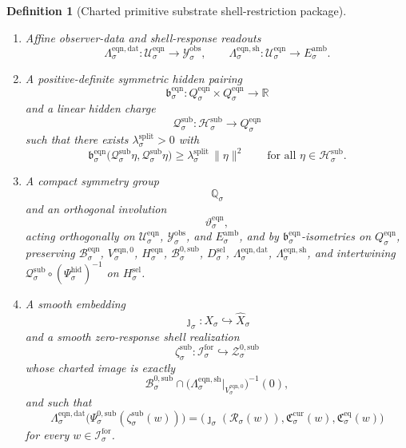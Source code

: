 \documentclass[11pt]{article}
\newcommand{\ForSpace}[1]{\mathcal I_{#1}^{\mathrm{for}}}
\newcommand{\Reduction}[1]{\mathcal R_{#1}}
\newcommand{\CurrentCarrier}[1]{\mathfrak C_{#1}^{\mathrm{cur}}}
\newcommand{\EqCarrier}[1]{\mathfrak C_{#1}^{\mathrm{eq}}}
\newcommand{\VisibleAffine}[1]{\widehat X_{#1}}
\newcommand{\DataSpace}[1]{\mathcal Y_{#1}^{\mathrm{obs}}}
\newcommand{\AmbientTarget}[1]{E_{#1}^{\mathrm{amb}}}
\newcommand{\EqnSpace}[1]{\mathcal U_{#1}^{\mathrm{eqn}}}
\newcommand{\EqnBody}[1]{\mathcal B_{#1}^{\mathrm{eqn}}}
\newcommand{\EqnZero}[1]{V_{#1}^{\mathrm{eqn},0}}
\newcommand{\EqnHidden}[1]{H_{#1}^{\mathrm{eqn}}}
\newcommand{\EqnData}[1]{\Lambda_{#1}^{\mathrm{eqn,dat}}}
\newcommand{\EqnShell}[1]{\Lambda_{#1}^{\mathrm{eqn,sh}}}
\newcommand{\EqnTarget}[1]{Q_{#1}^{\mathrm{eqn}}}
\newcommand{\EqnPair}[1]{\mathfrak b_{#1}^{\mathrm{eqn}}}
\newcommand{\EqnSym}[1]{\mathbb Q_{#1}}
\newcommand{\EqnTime}[1]{\vartheta_{#1}^{\mathrm{eqn}}}
\newcommand{\SubZeroCore}[1]{\mathcal Z_{#1}^{0,\mathrm{sub}}}
\newcommand{\SeedHidden}[1]{\mathcal H_{#1}^{\mathrm{sub}}}
\newcommand{\SubZeroChart}[1]{\Psi_{#1}^{0,\mathrm{sub}}}
\newcommand{\HiddenChart}[1]{\Psi_{#1}^{\mathrm{hid}}}
\newcommand{\SubSplit}[1]{\Phi_{#1}^{\mathrm{sub}}}
\newcommand{\SubCharge}[1]{\mathcal Q_{#1}^{\mathrm{sub}}}
\newcommand{\SubEmbed}[1]{\zeta_{#1}^{\mathrm{sub}}}
\newcommand{\ZeroBody}[1]{\mathcal B_{#1}^{0,\mathrm{sub}}}
\newcommand{\GapSpace}[1]{H_{#1}^{\mathrm{sel}}}
\newcommand{\GapBody}[1]{D_{#1}^{\mathrm{sel}}}
\newtheorem{definition}{Definition}
\begin{document}
\begin{definition}[Charted primitive substrate shell-restriction package]
\begin{enumerate}
\begin{equation}
    \SubSplit{\sigma}(z,\eta)
    =
    \SubZeroChart{\sigma}(z)+\HiddenChart{\sigma}(\eta).
    \label{eq:chartsplit}
    \end{equation}
    \item Affine observer-data and shell-response readouts
    \[
    \EqnData{\sigma}:\EqnSpace{\sigma}\to\DataSpace{\sigma},
    \qquad
    \EqnShell{\sigma}:\EqnSpace{\sigma}\to\AmbientTarget{\sigma}.
    \]
    \item A positive-definite symmetric hidden pairing
    \[
    \EqnPair{\sigma}:
    \EqnTarget{\sigma}\times\EqnTarget{\sigma}\to\mathbb R
    \]
    and a linear hidden charge
    \[
    \SubCharge{\sigma}:\SeedHidden{\sigma}\to\EqnTarget{\sigma}
    \]
    such that there exists \(\lambda_{\sigma}^{\mathrm{split}}>0\) with
    \begin{equation}
    \EqnPair{\sigma}\bigl(\SubCharge{\sigma}\eta,\SubCharge{\sigma}\eta\bigr)
    \ge
    \lambda_{\sigma}^{\mathrm{split}}\,
    \|\eta\|^{2}
    \qquad
    \text{for all }\eta\in\SeedHidden{\sigma}.
    \label{eq:hiddengap}
    \end{equation}
    \item A compact symmetry group
    \[
    \EqnSym{\sigma}
    \]
    and an orthogonal involution
    \[
    \EqnTime{\sigma},
    \]
    acting orthogonally on \(\EqnSpace{\sigma}\), \(\DataSpace{\sigma}\), and \(\AmbientTarget{\sigma}\), and by \(\EqnPair{\sigma}\)-isometries on \(\EqnTarget{\sigma}\), preserving \(\EqnBody{\sigma}\), \(\EqnZero{\sigma}\), \(\EqnHidden{\sigma}\), \(\ZeroBody{\sigma}\), \(\GapBody{\sigma}\), \(\EqnData{\sigma}\), \(\EqnShell{\sigma}\), and intertwining \(\SubCharge{\sigma}\circ(\HiddenChart{\sigma})^{-1}\) on \(\GapSpace{\sigma}\).
    \item A smooth embedding
    \[
    \jmath_{\sigma}:X_{\sigma}\hookrightarrow\VisibleAffine{\sigma}
    \]
    and a smooth zero-response shell realization
    \[
    \SubEmbed{\sigma}:\ForSpace{\sigma}\hookrightarrow\SubZeroCore{\sigma}
    \]
    whose charted image is exactly
    \[
    \ZeroBody{\sigma}\cap
    \bigl(\EqnShell{\sigma}\big|_{\EqnZero{\sigma}}\bigr)^{-1}(0),
    \]
    and such that
    \begin{equation}
    \EqnData{\sigma}\bigl(\SubZeroChart{\sigma}(\SubEmbed{\sigma}(w))\bigr)
    =
    \bigl(
    \jmath_{\sigma}(\Reduction{\sigma}(w)),
    \CurrentCarrier{\sigma}(w),
    \EqCarrier{\sigma}(w)
    \bigr)
    \label{eq:compat}
    \end{equation}
    for every \(w\in\ForSpace{\sigma}\).

\end{enumerate}
\end{definition}
\end{document}
